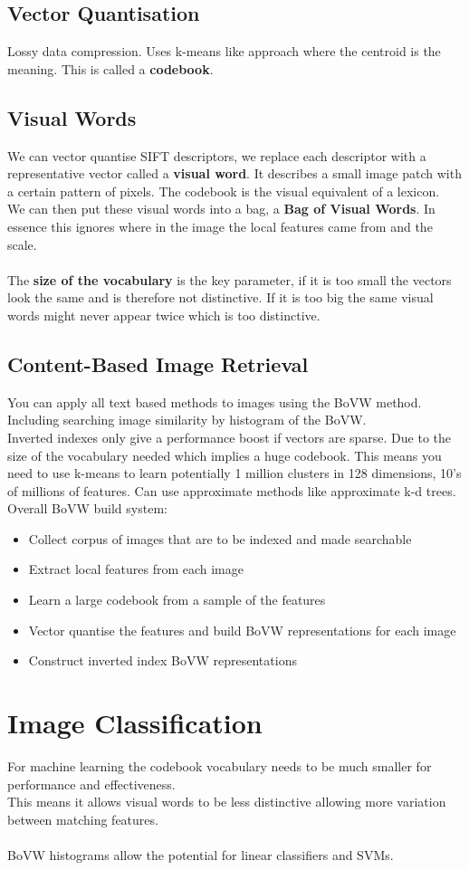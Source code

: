 \documentclass{article}
\begin{document}
	\subsection{Vector Quantisation}
	Lossy data compression. Uses k-means like approach where the centroid is the meaning. This is called a \textbf{codebook}.
	\subsection{Visual Words}
	We can vector quantise SIFT descriptors, we replace each descriptor with a representative vector called a \textbf{visual word}. It describes a small image patch with a certain pattern of pixels. The codebook is the visual equivalent of a lexicon.\\
	We can then put these visual words into a bag, a \textbf{Bag of Visual Words}. In essence this ignores where in the image the local features came from and the scale.\\
	\\
	The \textbf{size of the vocabulary} is the key parameter, if it is too small the vectors look the same and is therefore not distinctive. If it is too big the same visual words might never appear twice which is too distinctive.
	\subsection{Content-Based Image Retrieval}
	You can apply all text based methods to images using the BoVW method. Including searching image similarity by histogram of the BoVW.\\
	Inverted indexes only give a performance boost if vectors are sparse. Due to the size of the vocabulary needed which implies a huge codebook. This means you need to use k-means to learn potentially 1 million clusters in 128 dimensions, 10's of millions of features. Can use approximate methods like approximate k-d trees.\\
	Overall BoVW build system:
	\begin{itemize}
		\item Collect corpus of images that are to be indexed and made searchable
		\item Extract local features from each image
		\item Learn a large codebook from a sample of the features
		\item Vector quantise the features and build BoVW representations for each image
		\item Construct inverted index BoVW representations
	\end{itemize}
	
	\section{Image Classification}
	 For machine learning the codebook vocabulary needs to be much smaller for performance and effectiveness.\\
	 This means it allows visual words to be less distinctive allowing more variation between matching features.\\
	 \\
	 BoVW histograms allow the potential for linear classifiers and SVMs.
\end{document}
